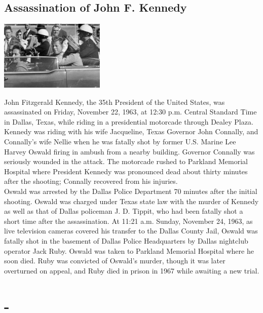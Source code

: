 \documentclass[11pt]{report}
\begin{document}
\subsection{Assassination of John F. Kennedy}
\vspace{2mm}\begin{center}\includegraphics[width=5cm]{./img/jfk.jpg}\end{center}
John Fitzgerald Kennedy, the 35th President of the United States, was assassinated on Friday, November 22, 1963, at 12:30 p.m. Central Standard Time in Dallas, Texas, while riding in a presidential motorcade through Dealey Plaza. Kennedy was riding with his wife Jacqueline, Texas Governor John Connally, and Connally's wife Nellie when he was fatally shot by former U.S. Marine Lee Harvey Oswald firing in ambush from a nearby building. Governor Connally was seriously wounded in the attack. The motorcade rushed to Parkland Memorial Hospital where President Kennedy was pronounced dead about thirty minutes after the shooting; Connally recovered from his injuries.\\
\indent Oswald was arrested by the Dallas Police Department 70 minutes after the initial shooting. Oswald was charged under Texas state law with the murder of Kennedy as well as that of Dallas policeman J. D. Tippit, who had been fatally shot a short time after the assassination. At 11:21 a.m. Sunday, November 24, 1963, as live television cameras covered his transfer to the Dallas County Jail, Oswald was fatally shot in the basement of Dallas Police Headquarters by Dallas nightclub operator Jack Ruby. Oswald was taken to Parkland Memorial Hospital where he soon died. Ruby was convicted of Oswald's murder, though it was later overturned on appeal, and Ruby died in prison in 1967 while awaiting a new trial.
\section{-}
\end{document}

